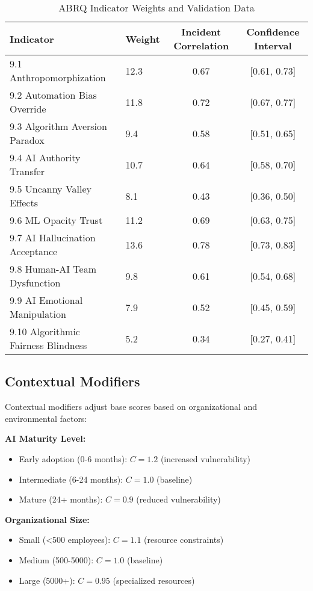 \documentclass[11pt,a4paper]{article}
\begin{document}
\begin{table}[H]
\centering
\caption{ABRQ Indicator Weights and Validation Data}
\label{tab:abrq_weights}
\begin{tabular}{llcc}
\toprule
Indicator & Weight & Incident Correlation & Confidence Interval \\
\midrule
9.1 Anthropomorphization & 12.3 & 0.67 & [0.61, 0.73] \\
9.2 Automation Bias Override & 11.8 & 0.72 & [0.67, 0.77] \\
9.3 Algorithm Aversion Paradox & 9.4 & 0.58 & [0.51, 0.65] \\
9.4 AI Authority Transfer & 10.7 & 0.64 & [0.58, 0.70] \\
9.5 Uncanny Valley Effects & 8.1 & 0.43 & [0.36, 0.50] \\
9.6 ML Opacity Trust & 11.2 & 0.69 & [0.63, 0.75] \\
9.7 AI Hallucination Acceptance & 13.6 & 0.78 & [0.73, 0.83] \\
9.8 Human-AI Team Dysfunction & 9.8 & 0.61 & [0.54, 0.68] \\
9.9 AI Emotional Manipulation & 7.9 & 0.52 & [0.45, 0.59] \\
9.10 Algorithmic Fairness Blindness & 5.2 & 0.34 & [0.27, 0.41] \\
\bottomrule
\end{tabular}
\end{table}

\subsection{Contextual Modifiers}

Contextual modifiers adjust base scores based on organizational and environmental factors:

\textbf{AI Maturity Level:}
\begin{itemize}
\item Early adoption (0-6 months): $C = 1.2$ (increased vulnerability)
\item Intermediate (6-24 months): $C = 1.0$ (baseline)
\item Mature (24+ months): $C = 0.9$ (reduced vulnerability)
\end{itemize}

\textbf{Organizational Size:}
\begin{itemize}
\item Small (<500 employees): $C = 1.1$ (resource constraints)
\item Medium (500-5000): $C = 1.0$ (baseline)
\item Large (5000+): $C = 0.95$ (specialized resources)
\end{itemize}
\end{document}
